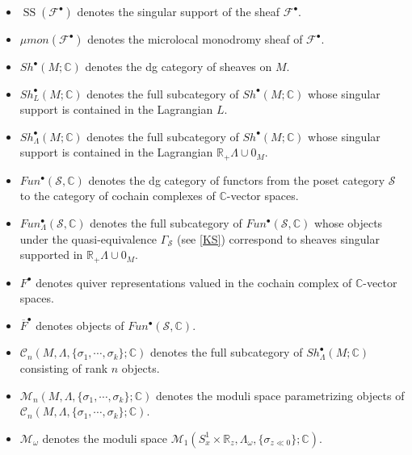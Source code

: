 \begin{itemize}[label={--}]
\item $\operatorname{SS}(\mathscr{F}^\bullet)$ denotes the singular support of the sheaf $\mathscr{F}^\bullet$.

\item $\mu mon(\mathscr{F}^\bullet)$ denotes the microlocal monodromy sheaf of $\mathscr{F}^\bullet$.

\item $Sh^\bullet(M;\mathbb{C})$ denotes the dg category of sheaves on $M$.

\item $Sh^\bullet_L(M;\mathbb{C})$ denotes the full subcategory of $Sh^\bullet(M;\mathbb{C})$ whose singular support is contained in the Lagrangian $L$.

\item $Sh^\bullet_\Lambda(M;\mathbb{C})$ denotes the full subcategory of $Sh^\bullet(M;\mathbb{C})$ whose singular support is contained in the Lagrangian $\mathbb{R}_+ \Lambda \cup 0_M$.

\item $Fun^\bullet(\mathcal{S},\mathbb{C})$ denotes the dg category of functors from the poset category $\mathcal{S}$ to the category of cochain complexes of $\mathbb{C}$-vector spaces.

\item $Fun^\bullet_\Lambda(\mathcal{S},\mathbb{C})$ denotes the full subcategory of $Fun^\bullet(\mathcal{S},\mathbb{C})$ whose objects under the quasi-equivalence $\Gamma_\mathcal{S}$ (see \ref{KS}) correspond to sheaves singular supported in $\mathbb{R}_+ \Lambda \cup 0_M$.

\item $F^\bullet$ denotes quiver representations valued in the cochain complex of $\mathbb{C}$-vector spaces.

\item $\overline{F}^\bullet$ denotes objects of $Fun^\bullet(\mathcal{S},\mathbb{C})$.

\item $\mathcal{C}_n(M,\Lambda,\{\sigma_1,\cdots,\sigma_k\};\mathbb{C})$ denotes the full subcategory of $Sh^\bullet_\Lambda(M;\mathbb{C})$ consisting of rank $n$ objects.

\item $\mathcal{M}_n(M,\Lambda,\{\sigma_1,\cdots,\sigma_k\};\mathbb{C})$ denotes the moduli space parametrizing objects of $\mathcal{C}_n(M,\Lambda,\{\sigma_1,\cdots,\sigma_k\};\mathbb{C})$.

\item $\mathcal{M}_\omega$ denotes the moduli space $\mathcal{M}_1(S^1_x \times \mathbb{R}_z,\Lambda_\omega,\{\sigma_{z\ll 0}\};\mathbb{C})$.


\end{itemize}
